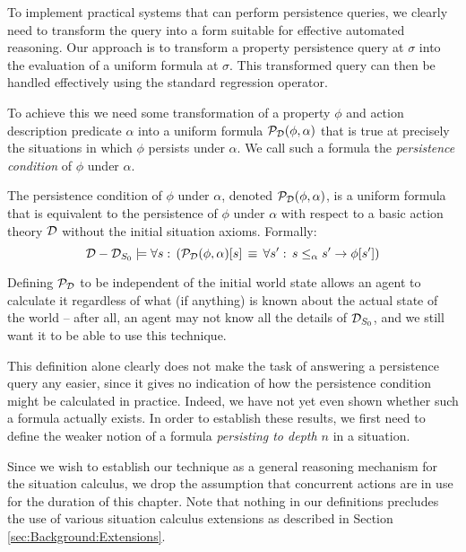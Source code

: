 To implement practical systems that can perform persistence queries,
we clearly need to transform the query into a form suitable for effective
automated reasoning. Our approach is to transform a property persistence
query at $\sigma$ into the evaluation of a uniform formula at $\sigma$.
This transformed query can then be handled effectively using the standard
regression operator.

To achieve this we need some transformation of a property $\phi$
and action description predicate $\alpha$ into a uniform formula
$\mathcal{P}_{\mathcal{D}}(\phi,\alpha)$ that is true at precisely the situations
in which $\phi$ persists under $\alpha$. We call such a formula
the \emph{persistence condition} of $\phi$ under $\alpha$.

\begin{defnL}
 The persistence condition of $\phi$
under $\alpha$, denoted $\mathcal{P}_{\mathcal{D}}(\phi,\alpha)$, is a uniform
formula that is equivalent to the persistence of $\phi$ under $\alpha$
with respect to a basic action theory $\mathcal{D}$ without the initial situation
axioms. Formally:\label{def:persistence-condition}\[
\mathcal{D}-\mathcal{D}_{S_{0}}\models\forall s:\,\left(\mathcal{P}_{\mathcal{D}}(\phi,\alpha)[s]\,\equiv\,\forall s':\, s\leq_{\alpha}s'\rightarrow\phi[s']\right)\]

\end{defnL}
Defining $\mathcal{P}_{\mathcal{D}}$ to be independent of the initial world state
allows an agent to calculate it regardless of what (if anything) is
known about the actual state of the world -- after all, an agent may
not know all the details of $\mathcal{D}_{S_{0}}$, and we still want it to
be able to use this technique.

This definition alone clearly does not make the task of answering
a persistence query any easier, since it gives no indication of how
the persistence condition might be calculated in practice. Indeed,
we have not yet even shown whether such a formula actually exists.
In order to establish these results, we first need to define the weaker
notion of a formula \emph{persisting to depth $n$} in a situation.

Since we wish to establish our technique as a general reasoning mechanism
for the situation calculus, we drop the assumption that concurrent
actions are in use for the duration of this chapter. Note that nothing
in our definitions precludes the use of various situation calculus
extensions as described in Section \ref{sec:Background:Extensions}.

